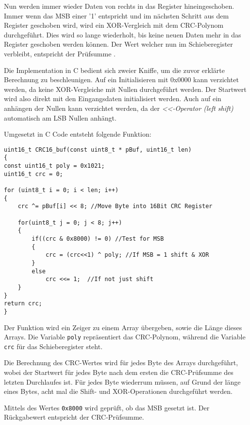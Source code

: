 \smallskip

Nun werden immer wieder Daten von rechts in das Register hineingeschoben. Immer wenn das \ac{MSB} einer '1' entspricht und im nächsten Schritt aus dem Register
geschoben wird, wird ein XOR-Vergleich mit dem CRC-Polynom durchgeführt. Dies wird so lange wiederholt, bis keine neuen Daten mehr in das Register geschoben werden können.
Der Wert welcher nun im Schieberegister verbleibt, entspricht der Prüfsumme \citep{IK_VL}.

\smallskip

Die Implementation in C bedient sich zweier Kniffe, um die zuvor erklärte Berechnung zu beschleunigen. Auf ein Initialisieren mit 0x0000 kann verzichtet werden,
da keine XOR-Vergleiche mit Nullen durchgeführt werden. Der Startwert wird also direkt mit den Eingangsdaten initialisiert werden. Auch auf ein anhängen der Nullen 
kann verzichtet werden, da der \textit{<<-Operator (left shift)} automatisch am \ac{LSB} Nullen anhängt. 

\newpage

Umgesetzt in C Code entsteht folgende Funktion: 

\begin{lstlisting}
uint16_t CRC16_buf(const uint8_t * pBuf, uint16_t len) 
{
const uint16_t poly = 0x1021;
uint16_t crc = 0;

for (uint8_t i = 0; i < len; i++)
{
    crc ^= pBuf[i] << 8; //Move Byte into 16Bit CRC Register

    for(uint8_t j = 0; j < 8; j++)
    {
        if((crc & 0x8000) != 0) //Test for MSB
        {
            crc = (crc<<1) ^ poly; //If MSB = 1 shift & XOR
        }
        else
            crc <<= 1;	//If not just shift
    }
}
return crc;
}
\end{lstlisting}

Der Funktion wird ein Zeiger zu einem Array übergeben, sowie die Länge dieses Arrays. Die Variable \lstinline!poly! repräsentiert das CRC-Polynom,
während die Variable \lstinline!crc! für das Schieberegister steht.

\smallskip

Die Berechnung des CRC-Wertes wird für jedes Byte des Arrays durchgeführt, wobei der Startwert für jedes Byte nach dem ersten die CRC-Prüfsumme des 
letzten Durchlaufes ist. Für jedes Byte wiederrum müssen, auf Grund der länge eines Bytes, acht mal die Shift- und XOR-Operationen durchgeführt werden.

\smallskip

Mittels des Wertes \lstinline!0x8000! wird geprüft, ob das \ac{MSB} gesetzt ist. Der Rückgabewert entspricht der CRC-Prüfsumme. 

